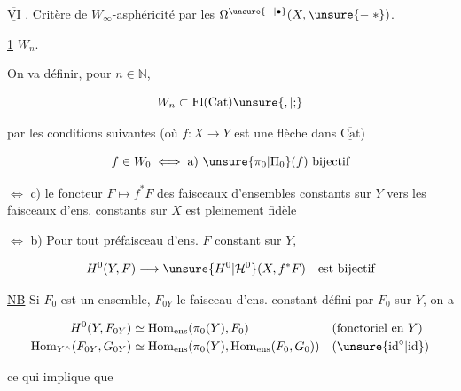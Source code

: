 

$\overline{\underline{\mathrm{VI}}}$ . \uline{Critère de} $W_\infty$-\uline{asphéricité par les} $\Omega^{\unsure{-|\bullet}}(X,\unsure{-|*})$.

\uline{1}   $W_n$.

On va définir, pour $n\in\mathbb N$,

\[
 W_n\subset\operatorname{Fl}(\mathrm{Cat})\unsure{,|{;}}
\]

par les conditions suivantes (où $f:X\to Y$ est une flèche dans $\underline{\overline{\mathrm{Cat}}}$)

\[
 f\in W_0\iff\text{a) }\unsure{\pi_0|\Pi_0}(f)\ \text{bijectif}
\]

   
$\Longleftrightarrow$ c) le foncteur $F\mapsto f^*F$ des faisceaux d'ensembles \uline{constants} sur $Y$ vers les faisceaux d'ens. constants sur $X$ est pleinement fidèle


$\Longleftrightarrow$ b) Pour tout préfaisceau d'ens. $F$ \uline{constant} sur $Y$,

\[
 H^0(Y,F)\longrightarrow \unsure{H^0|\mathcal H^0}(X,f^*F)\quad\text{est bijectif}
\]

\uline{NB} Si $F_0$ est un ensemble, $F_{0Y}$ le faisceau d'ens. constant défini par $F_0$ sur $Y$, on a

\[
\begin{aligned}
 H^0(Y,F_{0Y})&\simeq\operatorname{Hom}_{\mathrm{ens}}(\pi_0(Y),F_0)
    &&(\text{fonctoriel en }Y)\\
 \operatorname{Hom}_{Y^\wedge}(F_{0Y},G_{0Y})&\simeq
 \operatorname{Hom}_{\mathrm{ens}}(\pi_0(Y),\operatorname{Hom}_{\mathrm{ens}}(F_0,G_0))
    &&(\unsure{\text{id}^{\circ}|\text{id}})
\end{aligned}
\]

ce qui implique que

